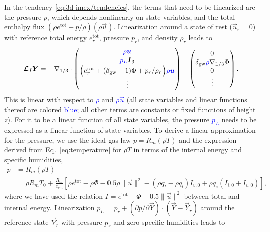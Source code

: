 \documentclass{report}
\begin{document}
In the tendency \eqref{eq:3d-imex/tendencies}, the terms that need to be linearized are the pressure $p$, which depends nonlinearly on state variables, and the total enthalpy flux $(\rho e^{\mathrm{tot}} + p/\rho) (\rho \vec{u})$. Linearization around a state of rest ($\vec{u}_r=0$) with reference total energy $e^{\mathrm{tot}}_r$, pressure $p_r$, and density $\rho_r$ leads to
 \begin{equation}\label{e:IMEX_linear}
 \vec{\mathcal{L}}_I \vec{Y} = 
 -\nabla_{1/3} \cdot \begin{pmatrix}
 \textcolor{blue}{\rho \vec{u}} \\
 \textcolor{blue}{p_L} \vec{I}_3  \\
 \Bigl(e^{\mathrm{tot}}_r  + (\delta_{\mathrm{gw}}-1)\Phi + p_r/\rho_r \Bigr) \textcolor{blue}{\rho \vec{u}}\\
\vdots
\end{pmatrix}
-
\begin{pmatrix}
0 \\
\delta_{\mathrm{gw}} \textcolor{blue} \rho \nabla_{1/3} \Phi \\
0\\
\vdots
\end{pmatrix}.
\end{equation}
This is linear with respect to \textcolor{blue}{$\rho$} and \textcolor{blue}{$\rho \vec{u}$} (all state variables and linear functions thereof are colored \textcolor{blue}{blue}; all other terms are constants or fixed functions of height $z$). For it to be a linear function of all state variables, the pressure \textcolor{blue}{$p_L$} needs to be expressed as a linear function of state variables. To derive a linear approximation for the pressure, we use the ideal gas law $p = R_m (\rho T)$ and the expression derived from Eq.~\eqref{eq:temperature} for $\rho T$ in terms of the internal energy and specific humidities,
\begin{equation}\label{e:pressure}
\begin{split}
p &= R_m (\rho T) \\
  &= \rho R_m T_0 + \frac{R_m}{c_{vm}} \left[\rho e^{\mathrm{tot}} - \rho \Phi - 0.5 \rho \|\vec{u}\|^2 - (\rho q_t - \rho q_l) I_{v,0} + \rho q_i (I_{i,0} + I_{v,0}) \right],
\end{split}
\end{equation}
where we have used the relation $I = e^{\mathrm{tot}} - \Phi - 0.5 \|\vec{u}\|^2$ between total and internal energy. Linearization $p_L = p_r + (\partial p/\partial\vec{Y})\cdot(\vec{Y}-\vec{Y}_r)$ around the reference state $\vec{Y}_r$ with pressure $p_r$ and zero specific humidities leads to 
\end{document}
